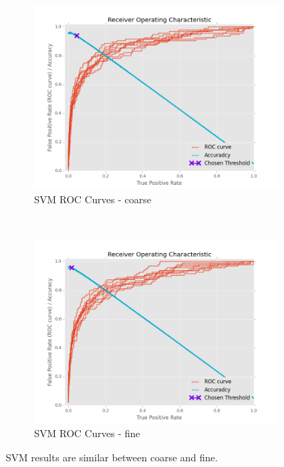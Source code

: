 \documentclass[ms]{nuthesis}
\begin{document}
\FloatBarrier
\begin{figure}[!htb]
    \centering
    \begin{subfigure}[t]{0.5\textwidth}
        \centering
        \includegraphics[width=\textwidth]{fig/SVM_FindThreshold_RocCurve_coarse}
        \caption{SVM ROC Curves - coarse}
    \end{subfigure}%
    ~
    \begin{subfigure}[t]{0.5\textwidth}
        \centering
        \includegraphics[width=\textwidth]{fig/SVM_FindThreshold_RocCurve_fine}
        \caption{SVM ROC Curves - fine}
    \end{subfigure}
    \caption{SVM results are similar between coarse and fine.}
\end{figure}
\FloatBarrier
\end{document}
